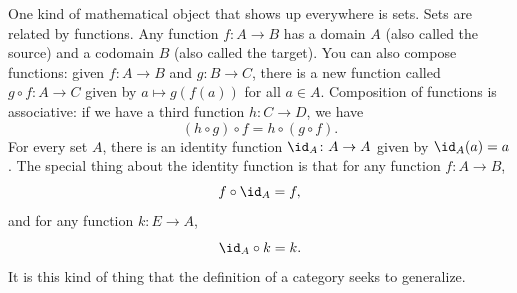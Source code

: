 \documentclass[noname]{notes}
\begin{document}
\begin{example}
	One kind of mathematical object that shows up everywhere is sets. Sets are related by functions. Any function $f \colon A \to B$ has a domain $A$ (also called the source) and a codomain $B$ (also called the target). You can also compose functions: given $f \colon A \to B$ and $g \colon B \to C$, there is a new function called $g \circ f \colon A \to C$ given by $a \mapsto g(f(a))$ for all $a \in A$. Composition of functions is associative: if we have a third function $h \colon C \to D$, we have 
	\[
		(h \circ g) \circ f = h \circ (g \circ f). 
	\]
	For every set $A$, there is an identity function $\id_A \colon A \to A$ given by $\id_A(a) = a$. The special thing about the identity function is that for any function $f \colon A \to B$, 
	\[
		f \circ \id_A = f, 
	\]
	and for any function $k \colon E \to A$, 
	\[
		\id_A \circ k = k. 
	\]
	It is this kind of thing that the definition of a category seeks to generalize. 
\end{example}
\end{document}
